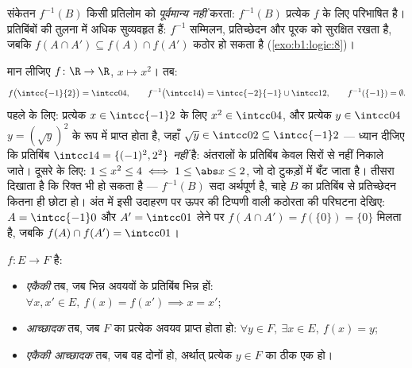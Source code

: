 \begin{remark}
संकेतन $f^{-1}(B)$ किसी प्रतिलोम  को \emph{पूर्वमान्य नहीं} करता:
$f^{-1}(B)$ प्रत्येक $f$ के लिए परिभाषित है।  प्रतिबिंबों की
तुलना में अधिक सुव्यवहृत हैं: $f^{-1}$ सम्मिलन, प्रतिच्छेदन और पूरक को
सुरक्षित रखता है, जबकि $f(A \cap A') \subseteq f(A) \cap f(A')$ कठोर हो सकता
है (\cref{exo:b1:logic:8})।
\end{remark}

\begin{example}[प्रतिबिंब और पूर्वप्रतिबिंब की संगणना]\label{ex:b1:logic:images}
मान लीजिए $f \colon \R \to \R$, $x \mapsto x^2$। तब:
\[
f\bigl(\intcc{-1}{2}\bigr) = \intcc04, \qquad
f^{-1}\bigl(\intcc14\bigr) = \intcc{-2}{-1} \cup \intcc12, \qquad
f^{-1}(\{-1\}) = \emptyset .
\]
पहले के लिए: प्रत्येक $x \in \intcc{-1}2$ के लिए $x^2 \in \intcc04$, और
प्रत्येक $y \in \intcc04$ $y = (\sqrt y)^2$ के रूप में प्राप्त होता है, जहाँ
$\sqrt y \in \intcc02 \subseteq \intcc{-1}2$ --- ध्यान दीजिए कि प्रतिबिंब
$\intcc14 = \{(-1)^2, 2^2\}$ \emph{नहीं} है: अंतरालों के प्रतिबिंब केवल
सिरों से नहीं निकाले जाते। दूसरे के लिए: $1 \leq x^2 \leq 4 \iff 1 \leq \abs
x \leq 2$, जो दो टुकड़ों में बँट जाता है। तीसरा दिखाता है कि 
रिक्त भी हो सकता है --- $f^{-1}(B)$ सदा अर्थपूर्ण है, चाहे $B$ का प्रतिबिंब
से प्रतिच्छेदन कितना ही छोटा हो। अंत में इसी उदाहरण पर ऊपर की टिप्पणी वाली
कठोरता की परिघटना देखिए: $A = \intcc{-1}0$ और $A' = \intcc01$ लेने पर $f(A
\cap A') = f(\{0\}) = \{0\}$ मिलता है, जबकि $f(A) \cap f(A') = \intcc01$।
\end{example}

\begin{definition}[एकैकी, आच्छादक, एकैकी आच्छादक]\label{def:b1:logic:inj}
 $f \colon E \to F$ है:
\begin{itemize}
  \item \emph{एकैकी} तब, जब भिन्न अवयवों के प्रतिबिंब भिन्न
  हों: $\forall x, x' \in E,\ f(x) = f(x') \implies x = x'$;
  \item \emph{आच्छादक} तब, जब $F$ का प्रत्येक अवयव प्राप्त
  होता हो: $\forall y \in F,\ \exists x \in E,\ f(x) = y$;
  \item \emph{एकैकी आच्छादक} तब, जब वह दोनों हो,
  अर्थात् प्रत्येक $y \in F$ का ठीक एक  हो।
\end{itemize}
\end{definition}

